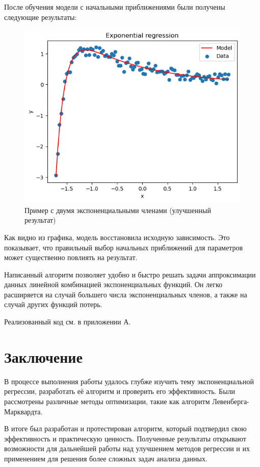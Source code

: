 После обучения модели с начальными приближениями были получены следующие результаты:

\begin{figure}[h!]
	\centering
	\includegraphics[width=0.7\linewidth]{../img/ex2_good.png}
	\caption{Пример с двумя экспоненциальными членами (улучшенный результат)}
\end{figure}


Как видно из графика, модель восстановила исходную зависимость. Это показывает, что правильный выбор начальных приближений для параметров может существенно повлиять на результат.

Написанный алгоритм позволяет удобно и быстро решать задачи аппроксимации данных линейной комбинацией экспоненциальных функций. Он легко расширяется на случай большего числа экспоненциальных членов, а также на случай других функций потерь.

Реализованный код см. в приложении А.

\newpage
\section*{Заключение}

В процессе выполнения работы удалось глубже изучить тему экспоненциальной регрессии, разработать её алгоритм и проверить его эффективность. Были рассмотрены различные методы оптимизации, такие как алгоритм Левенберга-Марквардта.

В итоге был разработан и протестирован алгоритм, который подтвердил свою эффективность и практическую ценность. Полученные результаты открывают возможности для дальнейшей работы над улучшением методов регрессии и их применением для решения более сложных задач анализа данных.

\newpage

